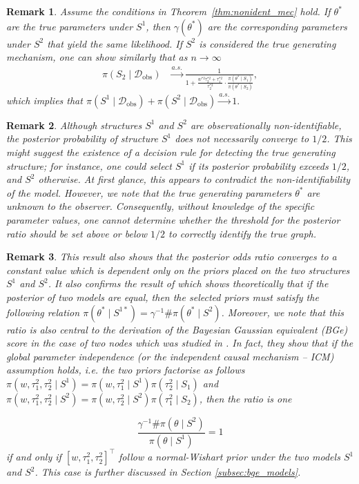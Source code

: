\documentclass[accepted]{uai2026} %
\newcommand{\train}{\mathcal{D}}
\newcommand{\obsdata}{\train_{\text{obs}}}
\def\transpose{\intercal}
\theoremstyle{boldremark}
\newtheorem{remark}{Remark}
\begin{document}
\begin{remark}
    Assume the conditions in Theorem~\ref{thm:nonident_mec} hold. If $\theta^*$ are the true parameters under $S^1$, then $\gamma(\theta^*)$ are the corresponding parameters under $S^2$ that yield the same likelihood. If $S^2$ is considered the true generating mechanism, one can show similarly that as $n \to \infty$
\begin{align*}
    \pi(S_2 \mid \obsdata) &\xrightarrow{a.s.} \frac{1}{1 + \frac{w^{*2}\tau_2^{*2} + \tau_1^{*2}}{\tau_2^{*2}} \cdot \frac{\pi(\theta^* \mid S_1)}{\pi(\theta^* \mid S_2)}},
\end{align*}
which implies that $\pi(S^1\mid \obsdata) +\pi(S^2 \mid \obsdata) \xrightarrow{a.s.}1.$
\end{remark} 

\begin{remark}
    Although structures $S^1$ and $S^2$ are observationally non-identifiable, the posterior probability of structure $S^1$ does not necessarily converge to $1/2$. This might suggest the existence of a decision rule for detecting the true generating structure; for instance, one could select $S^1$ if its posterior probability exceeds $1/2$, and $S^2$ otherwise. At first glance, this appears to contradict the non-identifiability of the model. However, we note that the true generating parameters $\theta^*$ are unknown to the observer. Consequently, without knowledge of the specific parameter values, one cannot determine whether the threshold for the posterior ratio should be set above or below $1/2$ to correctly identify the true graph. 
\end{remark}

\begin{remark}
    This result also shows that the posterior odds ratio converges to a constant value which is dependent only on the priors placed on the two structures $S^1$ and $S^2$. It also confirms the result of \citet{dhir2024bivariatecausaldiscoveryusing} which shows theoretically that if the posterior of two models are equal, then the selected priors must satisfy the following relation
$\pi(\theta^*\mid S^{1*}) = \gamma^{-1}\#\pi(\theta^*\mid S^2)$. Moreover, we note that this ratio is also central to the derivation of the Bayesian Gaussian equivalent (BGe) score in the case of two nodes which was studied in \citet{geiger1998characterization}. In fact, they show that if the global parameter independence (or the independent causal mechanism -- ICM) assumption holds, i.e. the two priors factorise as follows $\pi(w, \tau_1^2, \tau_2^2 \mid S^1) = \pi(w, \tau_1^2\mid S^1)\pi(\tau_2^2\mid S_1)$ and $\pi(w, \tau_1^2, \tau_2^2 \mid S^2) = \pi(w, \tau_2^2\mid S^2)\pi(\tau_1^2\mid S_2)$, then the ratio is one

$$\frac{\gamma^{-1}\#\pi(\theta\mid S^2)}{\pi(\theta\mid S^1)} =   1$$
if and only if $[w, \tau_1^2, \tau_2^2]^\transpose$ follow a normal-Wishart prior under the two models $S^1$ and $S^2$. This case is further discussed in Section \ref{subsec:bge_models}.
\end{remark}
\end{document}
